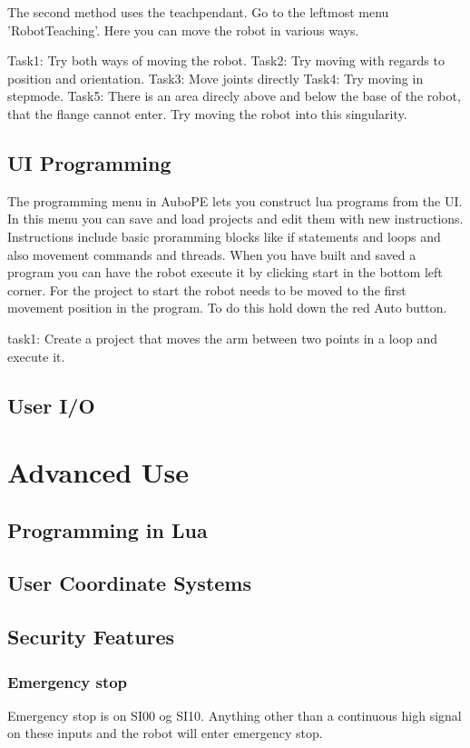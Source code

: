 \documentclass{article}
\begin{document}
The second method uses the teachpendant. Go to the leftmost menu 'RobotTeaching'. Here you can move the robot in various ways.

Task1: Try both ways of moving the robot. 
Task2: Try moving with regards to position and orientation. 
Task3: Move joints directly
Task4: Try moving in stepmode. 
Task5: There is an area direcly above and below the base of the robot, that the flange cannot enter. Try moving the robot into this singularity. 
  
\subsection{UI Programming} 

The programming menu in AuboPE lets you construct lua programs from the UI. In this menu you can save and load projects and edit them with new instructions. Instructions include basic proramming blocks like if statements and loops and also movement commands and threads. 
When you have built and saved a program you can have the robot execute it by clicking start in the bottom left corner. For the project to start the robot needs to be moved to the first movement position in the program. To do this hold down the red Auto button. 

task1: Create a project that moves the arm between two points in a loop and execute it. 

\subsection{User I/O}

\section{Advanced Use}
\subsection{Programming in Lua}
\subsection{User Coordinate Systems}
\subsection{Security Features}

\subsubsection{Emergency stop}
Emergency stop is on SI00 og SI10. Anything other than a continuous high signal on these inputs and the robot will enter emergency stop. 
\end{document}

